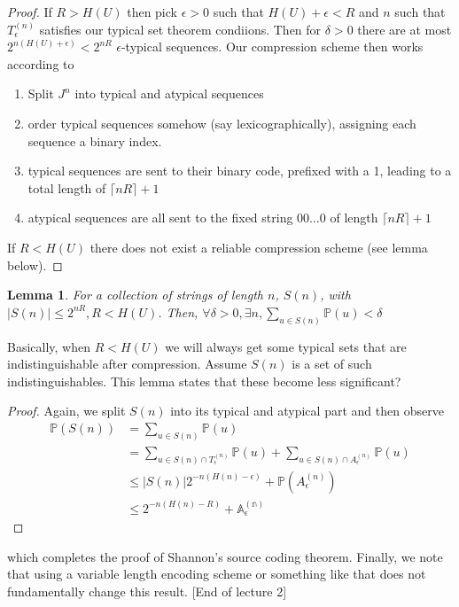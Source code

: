 \documentclass{article}
\newtheorem{lemma}{Lemma}
\theoremstyle{definition}
\begin{document}
\begin{proof}
  If $R > H(U)$ then pick $\epsilon > 0$ such that $H(U) + \epsilon < R$ and $n$
  such that $T_\epsilon^{(n)}$ satisfies our typical set theorem condiions. Then
  for $\delta > 0$ there are at most $2^{n(H(U) + \epsilon)} < 2^{nR}$
  $\epsilon$-typical sequences. Our compression scheme then works according to
  \begin{enumerate}
  \item Split $J^n$ into typical and atypical sequences
  \item order typical sequences somehow (say lexicographically), assigning
    each sequence a binary index.
  \item typical sequences are sent to their binary code, prefixed with a 1,
    leading to a total length of $\lceil nR \rceil + 1$
  \item atypical sequences are all sent to the fixed string $00 \dots 0$ of
    length $\lceil nR \rceil + 1$
  \end{enumerate}

  If $R < H(U)$ there does not exist a reliable compression scheme (see lemma
  below).
\end{proof}

\begin{lemma}
  For a collection of strings of length $n$, $S(n)$, with $|S(n)| \leq 2^{nR}, R
  < H(U)$.
  Then, $\forall \delta > 0, \exists n, \sum_{u \in S(n)} \mathbb{P}(u) <
  \delta$
\end{lemma}

Basically, when $R < H(U)$ we will always get some typical sets that are
indistinguishable after compression. Assume $S(n)$ is a set of such
indistinguishables. This lemma states that these become less significant? 

\begin{proof}
Again, we split $S(n)$ into its typical and atypical part and then observe
\begin{align*}
\mathbb{P}(S(n)) &= \sum_{u \in S(n)} \mathbb{P}(u) \\
&= \sum_{u \in S(n) \cap T_\epsilon^{(n)}} \mathbb{P}(u) + 
\sum_{u \in S(n) \cap A_\epsilon^{(n)}} \mathbb{P}(u) \\
&\leq |S(n)| 2^{-n(H(n) - \epsilon)} + \mathbb{P}(A_\epsilon^{(n)}) \\
&\leq 2^{-n(H(n) - R)} + \mathbb{A_\epsilon^{(n)}}
\end{align*}
\end{proof}

which completes the proof of Shannon's source coding theorem. Finally, we note
that using a variable length encoding scheme or something like that does not
fundamentally change this result. [End of lecture 2]
\end{document}

